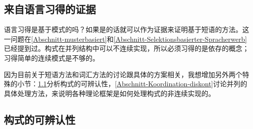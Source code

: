 \begin{exe}
\begin{xlist}[iv.]
\begin{exe}
\begin{xlist}[iv.]
\section{来自语言习得的证据} 
\label{sec-acquisition}

语言习得是基于模式的吗？如果是的话就可以作为证据来证明基于短语的方法。这一问题在\ref{Abschnitt-musterbasiert}和\ref{Abschnitt-Selektionsbasierter-Spracherwerb}已经提到过。构式在并列结构中可以不连续实现，所以必须习得的是依存的概念；习得简单的连续模式是不够的。

因为目前关于短语方法和词汇方法的讨论跟具体的方案相关，我想增加另外两个特殊的小节：\ref{sec-recognizability-of-constructions}分析构式的可辨认性，\ref{Abschnitt-Koordination-diskont}讨论并列的具体处理方法，来说明各种理论框架是如何处理构式的非连续实现的。

\subsection{构式的可辨认性}
\label{sec-recognizability-of-constructions}
 

\end{xlist}
\end{exe}
\end{xlist}
\end{exe}

